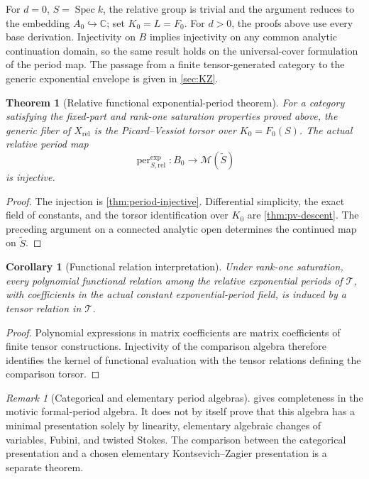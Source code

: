 \documentclass[11pt]{article}
\numberwithin{equation}{section}
\newtheorem{theorem}{Theorem}[section]
\newtheorem{corollary}[corollary]{Corollary}
\theoremstyle{definition}
\theoremstyle{remark}
\newtheorem{remark}[remark]{Remark}
\newcommand{\C}{\mathbb C}
\newcommand{\Tcal}{\mathcal T}
\newcommand{\Spec}{\operatorname{Spec}}
\newcommand{\per}{\operatorname{per}}
\begin{document}
For $d=0$, $S=\Spec k$, the relative group is trivial and the argument
reduces to the embedding $A_0\hookrightarrow\C$; set $K_0=L=F_0$.
For $d>0$, the proofs above use every base derivation. Injectivity on $B$
implies injectivity on any common analytic continuation domain, so the
same result holds on the universal-cover formulation of the period map.
The passage from a finite tensor-generated category to the generic
exponential envelope is given in \cref{sec:KZ}.

\begin{theorem}[Relative functional exponential-period theorem]
\label{thm:functional-period}
For a category satisfying the fixed-part and rank-one saturation properties
proved above, the generic fiber of $X_{\mathrm{rel}}$ is the Picard--Vessiot
torsor over $K_0=F_0(S)$. The actual relative period map
\[
 \per^{\exp}_{S,\mathrm{rel}}:B_0\longrightarrow\mathscr M(\widetilde S)
\]
is injective.
\end{theorem}
\begin{proof}
The injection is \cref{thm:period-injective}. Differential simplicity,
the exact field of constants, and the torsor identification over $K_0$
are \cref{thm:pv-descent}. The preceding argument on a connected analytic
open determines the continued map on $\widetilde S$.
\end{proof}

\begin{corollary}[Functional relation interpretation]\label{cor:functional-rel}
Under rank-one saturation, every polynomial functional relation among the
relative exponential periods of $\Tcal$, with coefficients in the actual
constant exponential-period field, is induced by a tensor relation in $\Tcal$.
\end{corollary}

\begin{proof}
Polynomial expressions in matrix coefficients are matrix coefficients of finite
tensor constructions.  Injectivity of the comparison algebra therefore
identifies the kernel of functional evaluation with the tensor relations defining
the comparison torsor.
\end{proof}

\begin{remark}[Categorical and elementary period algebras]
 gives completeness in the motivic formal-period algebra.
It does not by itself prove that this algebra has a minimal presentation solely by
linearity, elementary algebraic changes of variables, Fubini, and twisted Stokes.
The comparison between the categorical presentation and a chosen elementary
Kontsevich--Zagier presentation is a separate theorem.
\end{remark}
\end{document}
